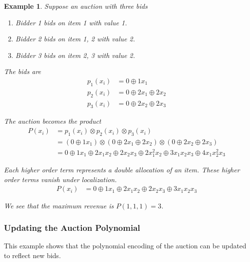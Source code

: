 \documentclass{article}
\newtheorem{example}{Example}
\begin{document}
\begin{example}
	Suppose an auction with three bids
	\begin{enumerate}
		\item Bidder 1 bids on item 1 with value 1.
		\item Bidder 2 bids on item 1, 2 with value 2.
		\item Bidder 3 bids on item 2, 3 with value 2.
	\end{enumerate}
	The bids are
	\begin{align*}
		p_1(x_i) & = 0 \oplus 1 x_1              \\
		p_2(x_i) & = 0 \oplus 2 x_1 \oplus 2 x_2 \\
		p_3(x_i) & = 0 \oplus 2 x_2 \oplus 2 x_3
	\end{align*}

	The auction becomes the product
	\begin{align*}
		P(x_i) & = p_1(x_i) \otimes p_2(x_i) \otimes p_3(x_i)                                                                      \\
		       & = (0 \oplus 1 x_1) \otimes (0 \oplus 2 x_1 \oplus 2 x_2) \otimes (0 \oplus 2 x_2 \oplus 2 x_3)                    \\
		       & = 0 \oplus 1 x_1 \oplus 2 x_1 x_2 \oplus 2 x_2 x_3 \oplus 2 x_1^2 x_2 \oplus 3 x_1 x_2 x_3 \oplus 4 x_1 x_2^2 x_3
	\end{align*}

	Each higher order term represents a double allocation of an item.
	These higher order terms vanish under localization.
	\begin{align*}
		P(x_i) & = 0 \oplus 1 x_1 \oplus 2 x_1 x_2 \oplus 2 x_2 x_3 \oplus 3 x_1 x_2 x_3
	\end{align*}

	We see that the maximum revenue is $P(1,1,1) = 3$.
\end{example}

\subsubsection{Updating the Auction Polynomial}
This example shows that the polynomial encoding of the auction can be updated to reflect new bids.
\end{document}
